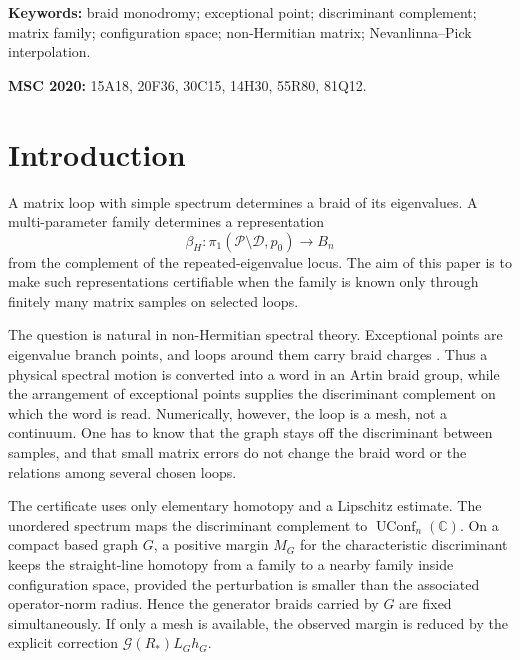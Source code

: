 \documentclass[11pt]{article}
\numberwithin{equation}{section}
\DeclareMathOperator{\UConf}{UConf}
\newcommand{\bbC}{\mathbb C}
\newcommand{\cD}{\mathcal D}
\newcommand{\cG}{\mathcal G}
\newcommand{\cP}{\mathcal P}
\begin{document}
\noindent\textbf{Keywords:} braid monodromy; exceptional point; discriminant
complement; matrix family; configuration space; non-Hermitian matrix;
Nevanlinna--Pick interpolation.

\medskip
\noindent\textbf{MSC 2020:} 15A18, 20F36, 30C15, 14H30, 55R80, 81Q12.

\bigskip


\section{Introduction}

A matrix loop with simple spectrum determines a braid of its eigenvalues.  A
multi-parameter family determines a representation
\[
  \beta_H:\pi_1(\cP\setminus\cD,p_0)\longrightarrow B_n
\]
from the complement of the repeated-eigenvalue locus.  The aim of this paper
is to make such representations certifiable when the family is known only
through finitely many matrix samples on selected loops.

The question is natural in non-Hermitian spectral theory.  Exceptional points
are eigenvalue branch points, and loops around them carry braid charges
\cite{Heiss2012,Ozdemir2019,Bergholtz2021,Ding2022,Carlstrom2018,Wojcik2020,Patil2022}.
Thus a physical spectral motion is converted into a word in an Artin braid
group, while the arrangement of exceptional points supplies the discriminant
complement on which the word is read.  Numerically, however, the loop is a
mesh, not a continuum.  One has to know that the graph stays off the
discriminant between samples, and that small matrix errors do not change the
braid word or the relations among several chosen loops.

The certificate uses only elementary homotopy and a Lipschitz estimate.  The
unordered spectrum maps the discriminant complement to \(\UConf_n(\bbC)\).
On a compact based graph \(G\), a positive margin \(M_G\) for the
characteristic discriminant keeps the straight-line homotopy from a family to
a nearby family inside configuration space, provided the perturbation is
smaller than the associated operator-norm radius.  Hence the generator braids
carried by \(G\) are fixed simultaneously.  If only a mesh is available, the
observed margin is reduced by the explicit correction \(\cG(R_*)L_Gh_G\).
\end{document}
